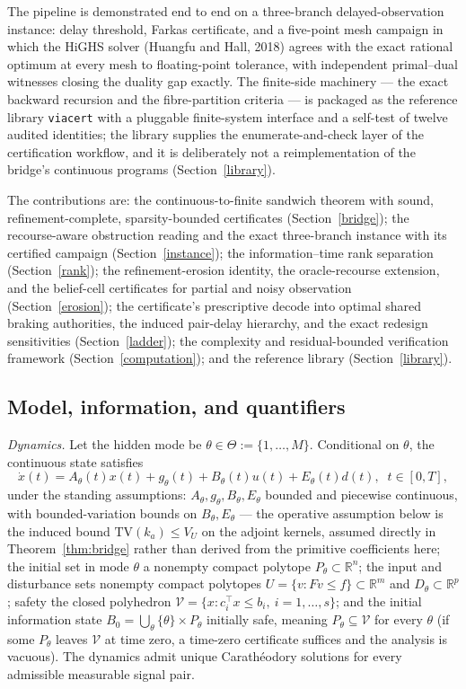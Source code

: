 \documentclass[10pt,twocolumn]{article}
\theoremstyle{plain}
\theoremstyle{definition}
\theoremstyle{remark}
\begin{document}
The pipeline is demonstrated end to end on a three-branch
delayed-observation instance: delay threshold, Farkas certificate, and a
five-point mesh campaign in which the HiGHS solver (Huangfu and Hall, 2018)
agrees with the exact rational optimum at every mesh to floating-point
tolerance, with independent
primal--dual witnesses closing the duality gap exactly. The finite-side
machinery --- the exact backward recursion and the fibre-partition criteria
--- is packaged as the reference library \texttt{viacert} with a pluggable
finite-system interface and a self-test of twelve audited identities; the
library supplies the enumerate-and-check layer of the certification
workflow, and it is deliberately not a reimplementation of the bridge's
continuous programs (Section~\ref{library}).

The contributions are: the continuous-to-finite sandwich theorem with sound,
refinement-complete, sparsity-bounded certificates (Section~\ref{bridge});
the recourse-aware obstruction reading and the exact three-branch instance
with its certified campaign (Section~\ref{instance}); the
information--time rank separation (Section~\ref{rank}); the refinement-erosion
identity, the oracle-recourse extension, and the belief-cell certificates
for partial and noisy observation (Section~\ref{erosion}); the
certificate's prescriptive decode into optimal shared braking authorities,
the induced pair-delay hierarchy, and the exact redesign sensitivities
(Section~\ref{ladder}); the
complexity and residual-bounded verification framework
(Section~\ref{computation}); and the reference library
(Section~\ref{library}).

\subsection{Model, information, and quantifiers}\label{model}

\emph{Dynamics.} Let the hidden mode be
\(\theta \in \Theta := \{1,\dots,M\}\). Conditional on \(\theta\), the
continuous state satisfies
\[
\dot x(t) = A_\theta(t)x(t) + g_\theta(t) + B_\theta(t)u(t) + E_\theta(t)d(t),
\;\; t \in [0,T],
\]
under the standing assumptions: \(A_\theta, g_\theta, B_\theta, E_\theta\)
bounded and piecewise continuous, with bounded-variation bounds on
\(B_\theta, E_\theta\) --- the operative assumption below is the induced
bound \(\mathrm{TV}(k_a) \le V_U\) on the adjoint kernels, assumed
directly in Theorem~\ref{thm:bridge} rather than derived from the
primitive coefficients here; the initial set in mode \(\theta\) a nonempty compact
polytope \(P_\theta \subset \mathbb{R}^n\); the input and disturbance sets
nonempty compact polytopes \(U = \{v : Fv \le f\} \subset \mathbb{R}^m\) and
\(D_\theta \subset \mathbb{R}^p\); safety the closed polyhedron
\(\mathcal{V} = \{x : c_i^\top x \le b_i,\ i = 1,\dots,s\}\); and the initial
information state
\(B_0 = \bigcup_{\theta} \{\theta\} \times P_\theta\) initially safe,
meaning \(P_\theta \subseteq \mathcal{V}\) for every \(\theta\) (if some
\(P_\theta\) leaves \(\mathcal{V}\) at time zero, a time-zero certificate
suffices and the analysis is vacuous). The dynamics admit unique
Carath\'eodory solutions for every admissible measurable signal pair.
\end{document}
